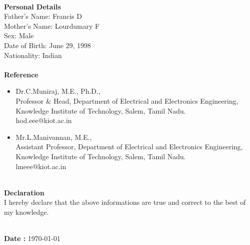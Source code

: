 \documentclass{article}
\begin{document}
\begin{flushleft}
		
		
		
		
		\Large \textbf{\\Personal Details}\\
		\Large \hspace*{20pt}Father’s Name\hspace{20pt}:  \Large Francis D \\ 
		\hspace*{20pt}\Large Mother’s Name\hspace{15pt}:  \Large Lourdumary F \\ 
		\hspace*{20pt}\Large Sex\hspace{88pt}: \Large Male \\ 
		\hspace*{20pt}\Large Date of Birth\hspace{26pt}: \Large June 29, 1998 \\ 
		\hspace*{20pt}\Large Nationality\hspace{39pt}: \Large Indian \\ 
		
		\Large \textbf{\\Reference}
		\begin{itemize}\item Dr.C.Muniraj, M.E., Ph.D., \\
			Professor \& Head, Department of Electrical and Electronics Engineering,\\
			Knowledge Institute of Technology, Salem, Tamil Nadu.\\
			hod.eee@kiot.ac.in
		\end{itemize}
		
		\begin{itemize}
			\item Mr.L.Manivannan, M.E.,\\
			Assistant Professor, Department of Electrical and Electronics Engineering,\\
			Knowledge Institute of Technology, Salem, Tamil Nadu.\\
			lmeee@kiot.ac.in
		\end{itemize}
		\Large \textbf{\\ Declaration}\\
		\hspace*{20pt}\Large I hereby declare that the above informations are true and correct to the best of my knowledge.
		
		\Large \textbf{\\Date : }{ \Large \today}
	\end{flushleft}
\end{document}
